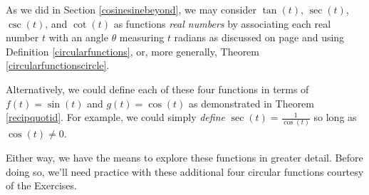 \documentclass{ximera}
\begin{document}
\begin{example}
\begin{explanation}
\begin{enumerate}
\begin{image}
\end{image}


\end{enumerate}
\end{explanation}
\end{example}



As we did in Section \ref{cosinesinebeyond}, we may consider $\tan(t)$, $\sec(t)$, $\csc(t)$, and $\cot(t)$ as functions \textit{real numbers} by associating each real number $t$ with an angle $\theta$ measuring $t$ radians as discussed on page \pageref{cosinesineequationsrealnumbers} and using Definition \ref{circularfunctions}, or, more generally, Theorem \ref{circularfunctionscircle}.


Alternatively, we could define each of these four functions in terms of $f(t) = \sin(t)$ and $g(t) = \cos(t)$ as demonstrated in Theorem \ref{recipquotid}.  For example, we could simply \textit{define} $\sec(t) = \frac{1}{\cos(t)}$ so long as $\cos(t) \neq 0$.  



Either way, we have the means to explore these functions in  greater  detail.  Before doing so, we'll need practice with these additional four circular functions courtesy of the Exercises.





\closegraphsfile
\end{document}
